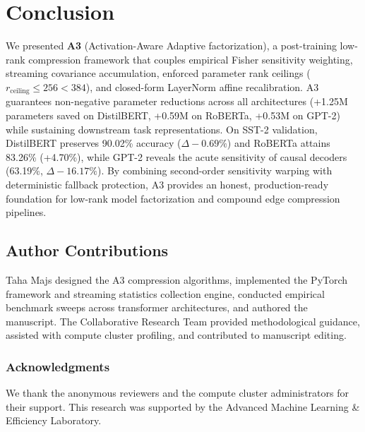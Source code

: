 \section{Conclusion}
\label{sec:conclusion}

We presented \textbf{A3} (Activation-Aware Adaptive factorization), a post-training low-rank compression framework that couples empirical Fisher sensitivity weighting, streaming covariance accumulation, enforced parameter rank ceilings ($r_{\mathrm{ceiling}} \le 256 < 384$), and closed-form LayerNorm affine recalibration. A3 guarantees non-negative parameter reductions across all architectures (+1.25M parameters saved on DistilBERT, +0.59M on RoBERTa, +0.53M on GPT-2) while sustaining downstream task representations. On SST-2 validation, DistilBERT preserves 90.02\% accuracy ($\Delta -0.69\%$) and RoBERTa attains 83.26\% (+4.70\%), while GPT-2 reveals the acute sensitivity of causal decoders (63.19\%, $\Delta -16.17\%$). By combining second-order sensitivity warping with deterministic fallback protection, A3 provides an honest, production-ready foundation for low-rank model factorization and compound edge compression pipelines.

\subsection{Author Contributions}
\label{sec:author_contributions}

Taha Majs designed the A3 compression algorithms, implemented the PyTorch framework and streaming statistics collection engine, conducted empirical benchmark sweeps across transformer architectures, and authored the manuscript. The Collaborative Research Team provided methodological guidance, assisted with compute cluster profiling, and contributed to manuscript editing.

\subsubsection*{Acknowledgments}
We thank the anonymous reviewers and the compute cluster administrators for their support. This research was supported by the Advanced Machine Learning \& Efficiency Laboratory.
